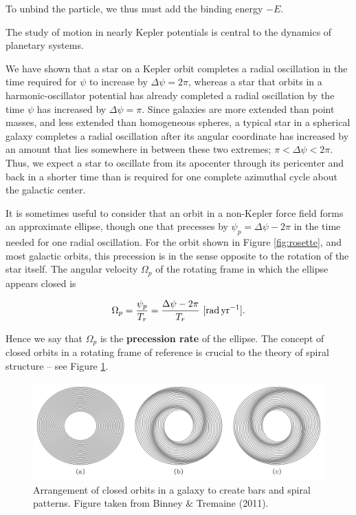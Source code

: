 \documentclass[a4paper,10pt]{article}
\begin{document}
{\noindent}To unbind the particle, we thus must add the binding energy $−E$.

{\noindent}The study of motion in nearly Kepler potentials is central to the dynamics of planetary systems.

{\noindent}We have shown that a star on a Kepler orbit completes a radial oscillation in the time required for $\psi$ to increase by $\Delta\psi=2\pi$, whereas a star that orbits in a harmonic-oscillator potential has already completed a radial oscillation by the time $\psi$ has increased by $\Delta\psi=\pi$. Since galaxies are more extended than point masses, and less extended than homogeneous spheres, a typical star in a spherical galaxy completes a radial oscillation after its angular coordinate has increased by an amount that lies somewhere in between these two extremes; $\pi<\Delta\psi<2\pi$. Thus, we expect a star to oscillate from its apocenter through its pericenter and back in a shorter time than is required for one complete azimuthal cycle about the galactic center.

{\noindent}It is sometimes useful to consider that an orbit in a non-Kepler force field forms an approximate ellipse, though one that precesses by $\psi_p=\Delta\psi−2\pi$ in the time needed for one radial oscillation. For the orbit shown in Figure \ref{fig:rosette}, and most galactic orbits, this precession is in the sense opposite to the rotation of the star itself. The angular velocity $\Omega_p$ of the rotating frame in which the ellipse appears closed is

\begin{align*}
    \Omega_p = \frac{\psi_p}{T_r} = \frac{\Delta\psi-2\pi}{T_r} ~ [{\rm rad\,yr^{-1}}].
\end{align*}

{\noindent}Hence we say that $\Omega_p$ is the \textbf{precession rate} of the ellipse. The concept of closed orbits in a rotating frame of reference is crucial to the theory of spiral structure -- see Figure \ref{fig:closedorbits}.

\begin{figure}[t]
    \centering
    \includegraphics[width=16cm]{figures/ClosedOrbits.png}
    \caption{\footnotesize{Arrangement of closed orbits in a galaxy to create bars and spiral patterns. Figure taken from Binney \& Tremaine (2011).}}
    \label{fig:closedorbits}
\end{figure}
\end{document}
